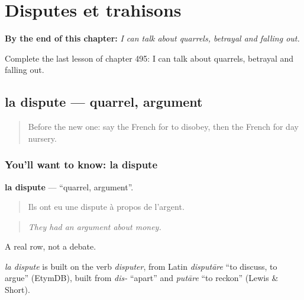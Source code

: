 
\chapter{Disputes et trahisons}
\label{ch:fr-disputes-et-trahisons}

\begin{chapteropening}
\textbf{By the end of this chapter:} \emph{I can talk about quarrels, betrayal and falling out.}

Complete the last lesson of chapter 495: I can talk about quarrels, betrayal and falling out.
\end{chapteropening}

\section[la dispute]{la dispute — quarrel, argument}

\label{lesson:FR-C495-dispute}



\begin{quote}
Before the new one: say the French for to disobey, then the French for day nursery.
\end{quote}

\subsection*{You'll want to know: la dispute}
\textbf{la dispute} — \textquotedblleft{}quarrel, argument\textquotedblright{}.

\begin{quote}
Ils ont eu une dispute à propos de l'argent.
\end{quote}

\begin{quote}
\emph{They had an argument about money.}
\end{quote}

A real row, not a debate.

\begin{cousinweb}
\emph{la dispute} is built on the verb \emph{disputer}, from Latin \emph{disputāre} \textquotedblleft{}to discuss, to argue\textquotedblright{} (EtymDB), built from \emph{dis-} \textquotedblleft{}apart\textquotedblright{} and \emph{putāre} \textquotedblleft{}to reckon\textquotedblright{} (Lewis \& Short).
\end{cousinweb}

